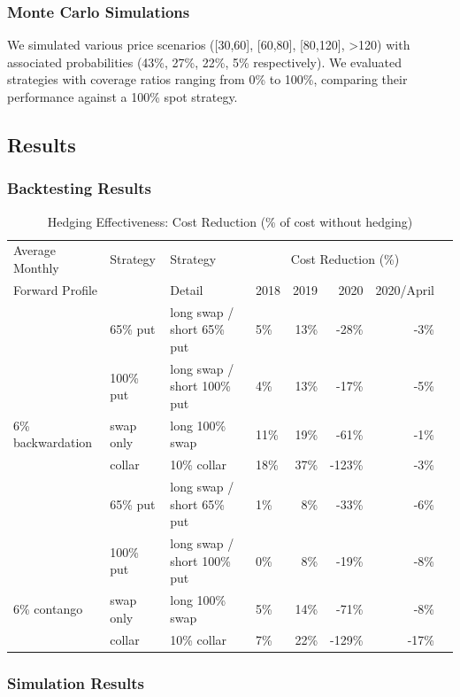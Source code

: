 \documentclass[12pt]{article}
\begin{document}
\subsubsection{Monte Carlo Simulations}
We simulated various price scenarios ([30,60], [60,80], [80,120], >120) with associated probabilities (43\%, 27\%, 22\%, 5\% respectively). We evaluated strategies with coverage ratios ranging from 0\% to 100\%, comparing their performance against a 100\% spot strategy.

\subsection{Results}

\subsubsection{Backtesting Results}

\begin{table}[h]
\centering
\caption{Hedging Effectiveness: Cost Reduction (\% of cost without hedging)}
\label{tab:hedging_effectiveness}
\begin{tabular}{llllrrrr}
\hline
Average Monthly & Strategy & Strategy & \multicolumn{4}{c}{Cost Reduction (\%)} \\
Forward Profile & & Detail & 2018 & 2019 & 2020 & 2020/April \\
\hline
& 65\% put & long swap / short 65\% put & 5\% & 13\% & -28\% & -3\% \\
& 100\% put & long swap / short 100\% put & 4\% & 13\% & -17\% & -5\% \\
6\% backwardation & swap only & long 100\% swap & 11\% & 19\% & -61\% & -1\% \\
& collar & 10\% collar & 18\% & 37\% & -123\% & -3\% \\
\hline
& 65\% put & long swap / short 65\% put & 1\% & 8\% & -33\% & -6\% \\
& 100\% put & long swap / short 100\% put & 0\% & 8\% & -19\% & -8\% \\
6\% contango & swap only & long 100\% swap & 5\% & 14\% & -71\% & -8\% \\
& collar & 10\% collar & 7\% & 22\% & -129\% & -17\% \\
\hline
\end{tabular}
\end{table}
\newpage
\subsubsection{Simulation Results}
\end{document}
